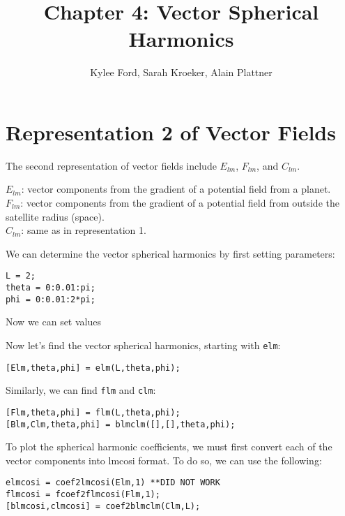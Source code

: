 \documentclass[11pt]{article}
\title{Chapter 4: Vector Spherical Harmonics}
\author{Kylee Ford, Sarah Kroeker, Alain Plattner}
\begin{document}
\maketitle

\section{Representation 2 of Vector Fields}

The second representation of vector fields include $E_{lm}$, $F_{lm}$, and $C_{lm}$.

$E_{lm}$: vector components from the gradient of a potential field from a planet. \\
$F_{lm}$: vector components from the gradient of a potential field from outside the satellite radius (space). \\
$C_{lm}$: same as in representation 1.

We can determine the vector spherical harmonics by first setting parameters:

\verb|L = 2;|\\
\verb|theta = 0:0.01:pi;|\\
\verb|phi = 0:0.01:2*pi;|

Now we can set values





















Now let's find the vector spherical harmonics, starting with \verb|elm|:

\verb|[Elm,theta,phi] = elm(L,theta,phi);|

Similarly, we can find \verb|flm| and \verb|clm|:

\verb|[Flm,theta,phi] = flm(L,theta,phi);|\\
\verb|[Blm,Clm,theta,phi] = blmclm([],[],theta,phi);|

To plot the spherical harmonic coefficients, we must first convert each of the vector components into lmcosi format.  To do so, we can use the following:

\verb|elmcosi = coef2lmcosi(Elm,1) **DID NOT WORK|\\
\verb|flmcosi = fcoef2flmcosi(Flm,1);|\\
\verb|[blmcosi,clmcosi] = coef2blmclm(Clm,L);|
\end{document}
